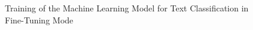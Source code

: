 \documentclass[onecolumn, journal, english, 12pt, a4paper]{IEEEtran} %
\theoremstyle{definition}
\begin{document}
\begin{figure}[!t]
\centering
{}
\hfil
{}
\caption{Training of the Machine Learning Model for Text Classification in Fine-Tuning Mode}
\label{fig:results}
\end{figure}
\end{document}
